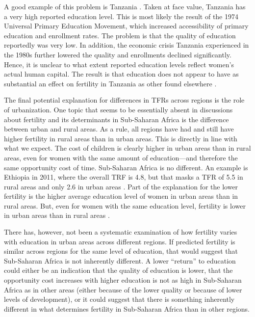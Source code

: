 A good example of this problem is Tanzania \citep{Galabawa2001,Wedgwood2005}. Taken at face value, Tanzania has a very high reported education level. This is most likely the result of the 1974 Universal Primary Education Movement, which increased accessibility of primary education and enrollment rates. The problem is that the quality of education reportedly was very low. In addition, the economic crisis Tanzania experienced in the 1980s further lowered the quality and enrollments declined significantly. Hence, it is unclear to what extent reported education levels reflect women's actual human capital. The result is that education does not appear to have as substantial an effect on fertility in Tanzania as other found elsewhere \citep{Alam2016}.

The final potential explanation for differences in TFRs across regions is the role of urbanization. One topic that seems to be essentially absent in discussions about fertility and its determinants in Sub-Saharan Africa is the difference between urban and rural areas. As a rule, all regions have had and still have higher fertility in rural areas than in urban areas. This is directly in line with what we expect. The cost of children is clearly higher in urban areas than in rural areas, even for women with the same amount of education---and therefore the same opportunity cost of time. Sub-Saharan Africa is no different. An example is Ethiopia in 2011, where the overall TRF is 4.8, but that masks a TFR of 5.5 in rural areas and only 2.6 in urban areas \citep{Central-Statistical-Agency/Ethiopia2012}. Part of the explanation for the lower fertility is the higher average education level of women in urban areas than in rural areas. But, even for women with the same education level, fertility is lower in urban areas than in rural areas \citep{Ainsworth1996}.

There has, however, not been a systematic examination of how fertility varies with education in urban areas across different regions. If predicted fertility is similar across regions for the same level of education, that would suggest that Sub-Saharan Africa is not inherently different. A lower ``return'' to education could either be an indication that the quality of education is lower, that the opportunity cost increases with higher education is not as high in Sub-Saharan Africa as in other areas (either because of the lower quality or because of lower levels of development), or it could suggest that there is something inherently different in what determines fertility in Sub-Saharan Africa than in other regions.

